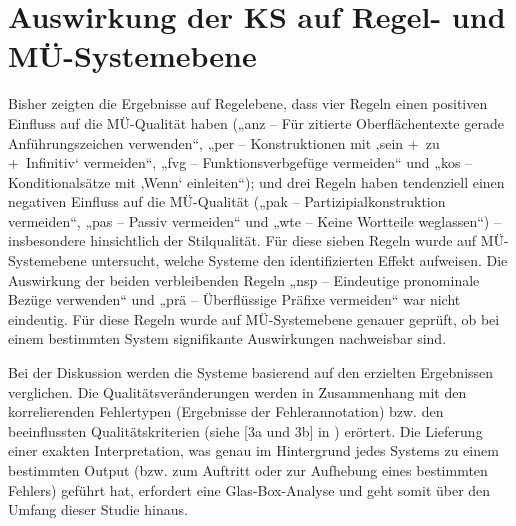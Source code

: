 \section{\label{sec:6.3}Auswirkung der KS auf Regel- und MÜ-Systemebene}

Bisher zeigten die Ergebnisse auf Regelebene, dass vier Regeln einen positiven Einfluss auf die MÜ-Qualität haben („anz -- Für zitierte Oberflächentexte gerade Anführungszeichen verwenden“, „per -- Konstruktionen mit ‚sein +~zu +~Infinitiv‘ vermeiden“, „fvg -- Funktionsverbgefüge vermeiden“ und „kos -- Konditionalsätze mit ‚Wenn‘ einleiten“); und drei Regeln haben tendenziell einen negativen Einfluss auf die MÜ-Qualität („pak -- Partizipialkonstruktion vermeiden“, „pas -- Passiv vermeiden“ und „wte -- Keine Wortteile weglassen“) -- insbesondere hinsichtlich der Stilqualität. Für diese sieben Regeln wurde auf MÜ-Systemebene untersucht, welche Systeme den identifizierten Effekt aufweisen. Die Auswirkung der beiden verbleibenden Regeln „nsp -- Eindeutige pronominale Bezüge verwenden“ und „prä -- Überflüssige Präfixe vermeiden“ war nicht eindeutig. Für diese Regeln wurde auf MÜ-Systemebene genauer geprüft, ob bei einem bestimmten System signifikante Auswirkungen nachweisbar sind.

Bei der Diskussion werden die Systeme basierend auf den erzielten Ergebnissen verglichen. Die Qualitätsveränderungen werden in Zusammenhang mit den korrelierenden Fehlertypen (Ergebnisse der Fehlerannotation) bzw. den beeinflussten Qualitätskriterien (siehe [3a und 3b] in ) erörtert. Die Lieferung einer exakten Interpretation, was genau im Hintergrund jedes Systems zu einem bestimmten Output (bzw. zum Auftritt oder zur Aufhebung eines bestimmten Fehlers) geführt hat, erfordert eine Glas-Box-Analyse und geht somit über den Umfang dieser Studie hinaus.

